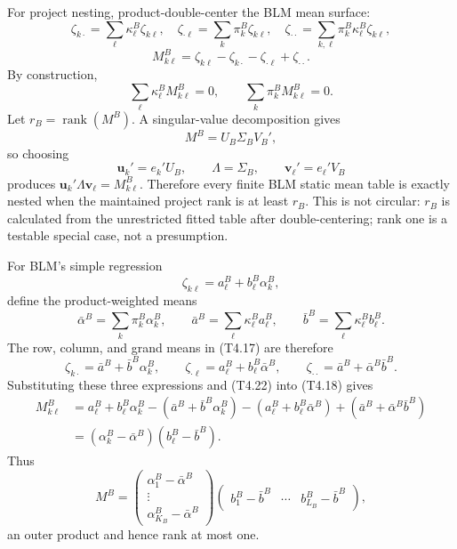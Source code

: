 \documentclass[11pt]{article}
\begin{document}
For project nesting, product-double-center the BLM mean surface:
\[
\zeta_{k\cdot}=\sum_\ell\kappa_\ell^B\zeta_{k\ell},
\quad
\zeta_{\cdot\ell}=\sum_k\pi_k^B\zeta_{k\ell},
\quad
\zeta_{\cdot\cdot}
=
\sum_{k,\ell}\pi_k^B\kappa_\ell^B\zeta_{k\ell},
\tag{T4.17}
\]
\[
M^B_{k\ell}
=
\zeta_{k\ell}
-\zeta_{k\cdot}
-\zeta_{\cdot\ell}
+\zeta_{\cdot\cdot}.
\tag{T4.18}
\]
By construction,
\[
\sum_\ell\kappa_\ell^BM^B_{k\ell}=0,
\qquad
\sum_k\pi_k^BM^B_{k\ell}=0.
\tag{T4.19}
\]
Let \(r_B=\operatorname{rank}(M^B)\).  A singular-value decomposition gives
\[
M^B=U_B\Sigma_BV_B',
\tag{T4.20}
\]
so choosing
\[
\mathbf u_k'=e_k'U_B,
\qquad
\Lambda=\Sigma_B,
\qquad
\mathbf v_\ell'=e_\ell'V_B
\tag{T4.21}
\]
produces
\(\mathbf u_k'\Lambda\mathbf v_\ell=M^B_{k\ell}\).  Therefore every finite
BLM static mean table is exactly nested when the maintained project rank is
at least \(r_B\).  This is not circular: \(r_B\) is calculated from the
unrestricted fitted table after double-centering; rank one is a testable
special case, not a presumption.

For BLM's simple regression
\[
\zeta_{k\ell}=a_\ell^B+b_\ell^B\alpha_k^B,
\tag{T4.22}
\]
define the product-weighted means
\[
\bar\alpha^B=\sum_k\pi_k^B\alpha_k^B,
\qquad
\bar a^B=\sum_\ell\kappa_\ell^Ba_\ell^B,
\qquad
\bar b^B=\sum_\ell\kappa_\ell^Bb_\ell^B.
\tag{T4.22a}
\]
The row, column, and grand means in (T4.17) are therefore
\[
\zeta_{k\cdot}=\bar a^B+\bar b^B\alpha_k^B,
\qquad
\zeta_{\cdot\ell}=a_\ell^B+b_\ell^B\bar\alpha^B,
\qquad
\zeta_{\cdot\cdot}=\bar a^B+\bar\alpha^B\bar b^B.
\tag{T4.22b}
\]
Substituting these three expressions and (T4.22) into (T4.18) gives
\[
\begin{aligned}
M^B_{k\ell}
&=
a_\ell^B+b_\ell^B\alpha_k^B
-(\bar a^B+\bar b^B\alpha_k^B)
-(a_\ell^B+b_\ell^B\bar\alpha^B)
+(\bar a^B+\bar\alpha^B\bar b^B)\\
&=
(\alpha_k^B-\bar\alpha^B)(b_\ell^B-\bar b^B).
\end{aligned}
\tag{T4.23}
\]
Thus
\[
M^B
=
\begin{pmatrix}
\alpha_1^B-\bar\alpha^B\\
\vdots\\
\alpha_{K_B}^B-\bar\alpha^B
\end{pmatrix}
\begin{pmatrix}
b_1^B-\bar b^B&\cdots&b_{L_B}^B-\bar b^B
\end{pmatrix},
\tag{T4.23a}
\]
an outer product and hence rank at most one.
\end{document}
